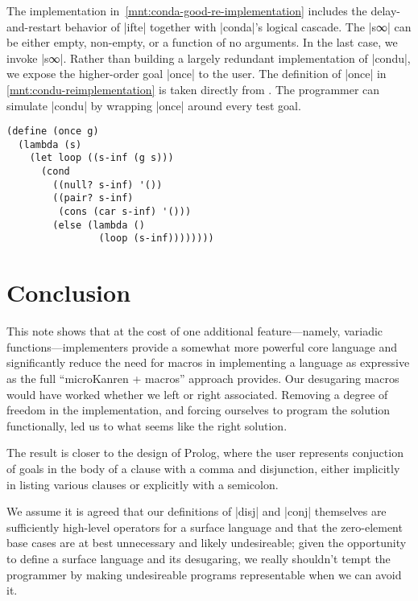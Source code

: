 \documentclass[sigplan,screen,draft,anonymous,review,natbib=false]{acmart}
\begin{document}
The implementation in~\cref{mnt:conda-good-re-implementation} includes
the delay-and-restart behavior of \rackinline|ifte| together with
\rackinline|conda|'s logical cascade. The \rackinline|s∞| can be
either empty, non-empty, or a function of no arguments. In the last
case, we invoke \rackinline|s∞|. Rather than building a largely
redundant implementation of \rackinline|condu|, we expose the
higher-order goal \rackinline|once| to the user. The definition of
\rackinline|once| in \cref{mnt:condu-reimplementation} is taken
directly from \cite{friedman2018reasoned}. The programmer can simulate
\rackinline|condu| by wrapping \rackinline|once| around every test
goal.


\begin{listing}
  \begin{verbatim}
(define (once g)
  (lambda (s)
    (let loop ((s-inf (g s)))
      (cond
        ((null? s-inf) '())
        ((pair? s-inf)
         (cons (car s-inf) '()))
        (else (lambda ()
                (loop (s-inf))))))))
  \end{verbatim}
  \caption{The \rackinline|once| function.}
  \label{mnt:condu-reimplementation}
\end{listing}


\section{Conclusion}\label{sec:conclusion}

This note shows that at the cost of one additional feature---namely,
variadic functions---implementers provide a somewhat more powerful
core language and significantly reduce the need for macros in
implementing a language as expressive as the full \enquote{microKanren
  + macros} approach provides. Our desugaring macros would have worked
whether we left or right associated. Removing a degree of freedom in
the implementation, and forcing ourselves to program the solution
functionally, led us to what seems like the right solution.

The result is closer to the design of Prolog, where the user
represents conjuction of goals in the body of a clause with a comma
and disjunction, either implicitly in listing various clauses or
explicitly with a semicolon.

We assume it is agreed that our definitions of \rackinline|disj| and
\rackinline|conj| themselves are sufficiently high-level operators for
a surface language and that the zero-element base cases are at best
unnecessary and likely undesireable; given the opportunity to define a
surface language and its desugaring, we really shouldn't tempt the
programmer by making undesireable programs representable when we can
avoid it.
\end{document}
